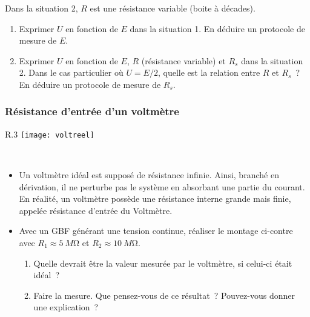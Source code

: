 \documentclass[../main/main.tex]{subfiles}
\begin{document}
Dans la situation 2, $R$ est une résistance variable (boite à décades).
\begin{enumerate}
	\item Exprimer $U$ en fonction de $E$ dans la situation 1. En déduire un
	      protocole de mesure de $E$.
	\item Exprimer $U$ en fonction de $E$, $R$ (résistance variable) et $R_s$
	      dans la situation 2. Dans le cas particulier où $U=E/2$, quelle est la
	      relation entre  $R$ et $R_s$~? En déduire un protocole de mesure de
	      $R_s$.
\end{enumerate}

\subsubsection{Résistance d'entrée d'un voltmètre}

\begin{wrapfigure}[6]{R}{.3\linewidth}
	\vspace*{-35pt}
	\centering
	\texttt{[image: voltreel]}
\end{wrapfigure}
~\vspace{-20pt}
\begin{itemize}
	\item Un voltmètre idéal est supposé de résistance infinie. Ainsi, branché
	      en dérivation, il ne perturbe pas le système en absorbant une partie du
	      courant. En réalité, un voltmètre possède une résistance interne grande
	      mais finie, appelée résistance d’entrée du Voltmètre.
	\item Avec un GBF générant une tension continue, réaliser le montage
	      ci-contre avec $R_1 \approx \SI{5}{M\ohm}$ et $R_2 \approx
		      \SI{10}{M\ohm}$.
	      \begin{enumerate}
		      \item Quelle devrait être la valeur mesurée par le voltmètre, si
		            celui-ci était idéal ?
		      \item Faire la mesure. Que pensez-vous de ce résultat ? Pouvez-vous
		            donner une explication ?
	      \end{enumerate}
\end{itemize}

\end{document}
